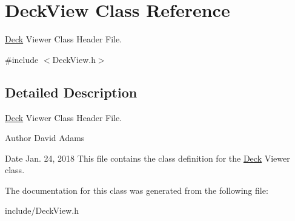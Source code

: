 \hypertarget{classDeckView}{\section{Deck\-View Class Reference}
\label{classDeckView}
}


\hyperlink{classDeck}{Deck} Viewer Class Header File.  




{\ttfamily \#include $<$Deck\-View.\-h$>$}



\subsection{Detailed Description}
\hyperlink{classDeck}{Deck} Viewer Class Header File. 

\begin{DoxyAuthor}{Author}
David Adams 
\end{DoxyAuthor}
\begin{DoxyDate}{Date}
Jan. 24, 2018 This file contains the class definition for the \hyperlink{classDeck}{Deck} Viewer class. 
\end{DoxyDate}


The documentation for this class was generated from the following file\-:\begin{DoxyCompactItemize}
\item 
include/Deck\-View.\-h\end{DoxyCompactItemize}
